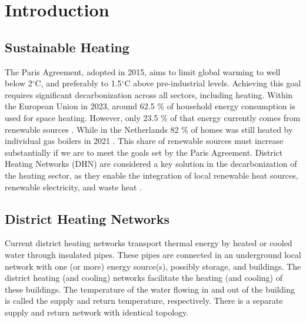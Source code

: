 %
\chapter{Introduction} \label{chap::intro}
\section{Sustainable Heating}
The Paris Agreement, adopted in 2015, aims to limit global warming to well below 2$^{\circ}\text{C}$, and preferably to 1.5$^{\circ}\text{C}$ above pre-industrial levels. Achieving this goal requires significant decarbonization across all sectors, including heating. Within the European Union in 2023, around 62.5 \% of household energy consumption is used for space heating. However, only 23.5 \% of that energy currently comes from renewable sources \cite{EUenergie}. While in the Netherlands 82 \% of homes was still heated by individual gas boilers in 2021 \cite{NLenergie}.
This share of renewable sources must increase substantially if we are to meet the goals set by the Paris Agreement. District Heating Networks (DHN) are considered a key solution in the decarbonization of the heating sector, as they enable the integration of local renewable heat sources, renewable electricity, and waste heat \cite{KUNTUAROVA}.


\section{District Heating Networks}
Current district heating networks transport thermal energy by heated or cooled water through insulated pipes. These pipes are connected in an underground local network with one (or more) energy source(s), possibly storage, and buildings. The district heating (and cooling) networks facilitate the heating (and cooling) of these buildings. The temperature of the water flowing in and out of the building is called the supply and return temperature, respectively. There is a separate supply and return network with identical topology. 

